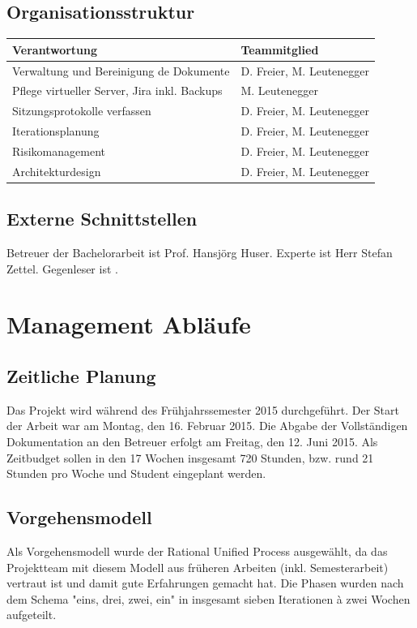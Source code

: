 \subsection*{Organisationsstruktur}
\begin{tabularx}{\textwidth}{Xl}
	\textbf{Verantwortung}	& \textbf{Teammitglied} \\
	\hline
	Verwaltung und Bereinigung de Dokumente		& D. Freier, M. Leutenegger \\ \hline
	Pflege virtueller Server, Jira inkl. Backups	& M. Leutenegger \\ \hline
	Sitzungsprotokolle verfassen					& D. Freier, M. Leutenegger \\ \hline
	Iterationsplanung							& D. Freier, M. Leutenegger \\ \hline
	Risikomanagement								& D. Freier, M. Leutenegger \\ \hline
	Architekturdesign							& D. Freier, M. Leutenegger \\ \hline
\end{tabularx}

\subsection*{Externe Schnittstellen}
Betreuer der Bachelorarbeit ist Prof. Hansjörg Huser. Experte ist Herr Stefan Zettel. Gegenleser ist \tbd .
\pagebreak

\section*{Management Abläufe}
\subsection*{Zeitliche Planung}
Das Projekt wird während des Frühjahrssemester 2015 durchgeführt. Der Start der Arbeit war am Montag, den 16. Februar 2015. Die Abgabe der Vollständigen Dokumentation an den Betreuer erfolgt am Freitag, den 12. Juni 2015. Als Zeitbudget sollen in den 17 Wochen insgesamt 720 Stunden, bzw. rund 21 Stunden pro Woche und Student eingeplant werden.

\subsection*{Vorgehensmodell}
Als Vorgehensmodell wurde der Rational Unified Process ausgewählt, da das Projektteam mit diesem Modell aus früheren Arbeiten (inkl. Semesterarbeit) vertraut ist und damit gute Erfahrungen gemacht hat. Die Phasen wurden nach dem Schema "eins, drei, zwei, ein" in insgesamt sieben Iterationen à zwei Wochen aufgeteilt. \tbd

